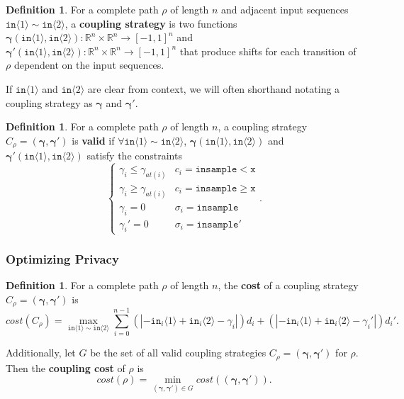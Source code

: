 \documentclass[12pt]{article}
\newcommand{\RR}{\mathbb{R}}
\newcommand{\gguard}[1][x]{\texttt{insample}\geq #1}
\newcommand{\lguard}[1][x]{\texttt{insample} < #1}
\newcommand{\brangle}[1]{\langle #1 \rangle}
\theoremstyle{definition}
\newtheorem{defn}[thm]{Definition}
\begin{document}
\begin{defn}
    For a complete path $\rho$ of length $n$ and adjacent input sequences $\texttt{in}\brangle{1}\sim \texttt{in}\brangle{2}$, a \textbf{coupling strategy} is two functions $\bm{\gamma}(\texttt{in}\brangle{1}, \texttt{in}\brangle{2}):\RR^n\times \RR^n\to [-1, 1]^n$ and $\bm{\gamma}'(\texttt{in}\brangle{1}, \texttt{in}\brangle{2}):\RR^n\times \RR^n\to [-1, 1]^n$ that produce shifts for each transition of $\rho$ dependent on the input sequences. 

    If $\texttt{in}\brangle{1}$ and $\texttt{in}\brangle{2}$ are clear from context, we will often shorthand notating a coupling strategy as $\bm{\gamma}$ and $\bm{\gamma}'$. 
\end{defn}

\begin{defn}
    For a complete path $\rho$ of length $n$, a coupling strategy $C_\rho = (\bm{\gamma}, \bm{\gamma}')$ is \textbf{valid} if $\forall \texttt{in}\brangle{1}\sim\texttt{in}\brangle{2}$, $\bm{\gamma}(\texttt{in}\brangle{1}, \texttt{in}\brangle{2})$ and $\bm{\gamma}'(\texttt{in}\brangle{1}, \texttt{in}\brangle{2})$ satisfy the constraints \[
        \begin{cases}
          \gamma_i\leq\gamma_{at(i)} & c_i = \lguard[\texttt{x}]\\
          \gamma_i\geq\gamma_{at(i)} & c_i = \gguard[\texttt{x}]\\
          \gamma_i=0 & \sigma_i = \texttt{insample}\\
          \gamma_i'=0 & \sigma_i = \texttt{insample}'
        \end{cases}.
      \]
\end{defn}

\subsubsection{Optimizing Privacy}

\begin{defn}
    For a complete path $\rho$ of length $n$, the \textbf{cost} of a coupling strategy $C_\rho=(\bm{\gamma}, \bm{\gamma}')$ is \[cost(C_\rho) = \max_{\texttt{in}\brangle{1}\sim\texttt{in}\brangle{2}}\sum_{i=0}^{n-1}(|-\texttt{in}_i\brangle{1}+\texttt{in}_i\brangle{2}-\gamma_i|)d_i+(|-\texttt{in}_i\brangle{1}+\texttt{in}_i\brangle{2}-\gamma_i'|)d_i'.\]

    Additionally, let $G$ be the set of all valid coupling strategies $C_\rho=(\bm{\gamma}, \bm{\gamma}')$ for $\rho$. Then the \textbf{coupling cost} of $\rho$ is 
    \[cost(\rho) = \min_{(\bm{\gamma}, \bm{\gamma}')\in G}cost((\bm{\gamma}, \bm{\gamma}')).\]
\end{defn}
\end{document}
